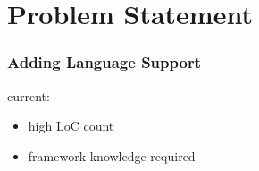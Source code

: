 



\section{Problem Statement}
\begin{frame}
  \frametitle{Adding Language Support}
  current:
  \begin{itemize}
    \item high LoC count
    \item framework knowledge required
  \end{itemize}
\end{frame}



